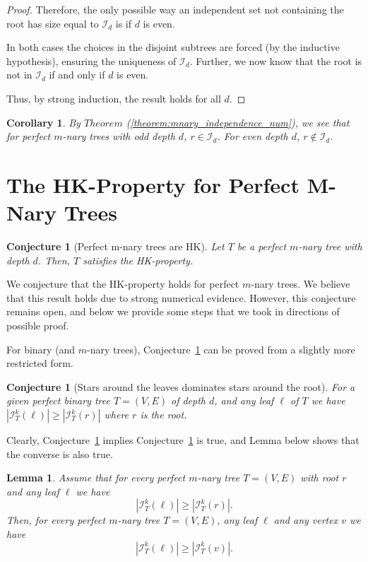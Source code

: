 \documentclass{amsart}
\newtheorem{lemma}[theorem]{Lemma}
\newtheorem{conjecture}[theorem]{Conjecture}
\newtheorem{corollary}[theorem]{Corollary}
\theoremstyle{definition}
\newcommand\II{{\mathcal I}}
\begin{document}
\begin{proof}
	Therefore, the only possible way an independent set not containing the root has size equal to $\II_d$ is if $d$ is even.

	\medskip

	In both cases the choices in the disjoint subtrees are forced (by the inductive hypothesis), ensuring the uniqueness of $\mathcal{I}_{d}$. Further, we now know that the root is not in $\mathcal{I}_{d}$ if and only if $d$ is even.

	Thus, by strong induction, the result holds for all $d$.
\end{proof}

\begin{corollary}\label{cor:root_in_not_in}
	By $Theorem$ (\ref{theorem:mnary_independence_num}), we see that for perfect $m$-nary trees with odd depth $d$, $r \in \mathcal{I}_d$. For even depth $d$, $r \not\in \mathcal{I}_d$.
\end{corollary}

\section{The HK-Property for Perfect M-Nary Trees}

\begin{conjecture}[Perfect m-nary trees are HK]\label{conj:mnary_hk}
	Let $T$ be a perfect $m$-nary tree with depth $d$. Then, $T$ satisfies the HK-property.
\end{conjecture}

We conjecture that the HK-property holds for perfect $m$-nary trees. We believe that this result holds due to strong numerical evidence. However, this conjecture remains open, and below we provide some steps that we took in directions of possible proof.

For binary (and $m$-nary trees), Conjecture~\ref{conj:mnary_hk} can be proved from a slightly more restricted form.
\begin{conjecture}[Stars around the leaves dominates stars around the root]\label{conj:leaves_dom_root}
	For a given perfect binary tree $T = (V, E)$	of depth $d$, and any leaf $\ell$ of $T$ we have $|\mathcal{I}^k_T(\ell)| \geq  |\mathcal{I}^k_T(r)|$ where $r$ is the root.
\end{conjecture}

Clearly, Conjecture~\ref{conj:mnary_hk} implies Conjecture~\ref{conj:leaves_dom_root} is true, and Lemma below shows that the converse is also true.
\begin{lemma}\label{lemma:leaves_dom_root}
	Assume that for every perfect $m$-nary  tree $T = (V, E)$ with root $r$ and any leaf $\ell$ we have $$|\mathcal{I}^k_T(\ell)| \geq  |\mathcal{I}^k_T(r)|.$$
	Then, for every perfect $m$-nary  tree $T = (V, E)$, any leaf $\ell$ and any vertex $v$ we have $$|\mathcal{I}^k_T(\ell)| \geq  |\mathcal{I}^k_T(v)|.$$
\end{lemma}
\end{document}
